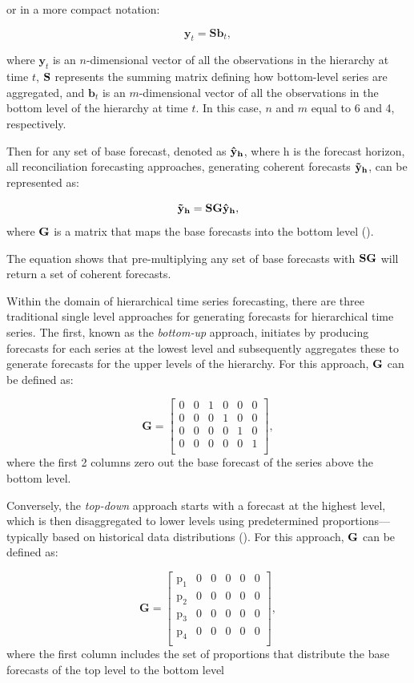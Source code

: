 \documentclass[
  11pt,
  a4paper,
]{article}
\begin{document}
or in a more compact notation:

\[
\textbf{y}_{t} = \textbf{S}\textbf{b}_{t},
\]

where \(\textbf{y}_t\) is an \(n\)-dimensional vector of all the
observations in the hierarchy at time \(t\), \(\bf{S}\) represents the
summing matrix defining how bottom-level series are aggregated, and
\(\textbf{b}_t\) is an \(m\)-dimensional vector of all the observations
in the bottom level of the hierarchy at time \(t\). In this case, \(n\)
and \(m\) equal to 6 and 4, respectively.

Then for any set of base forecast, denoted as \(\bf{\hat{y}}_{h}\),
where h is the forecast horizon, all reconciliation forecasting
approaches, generating coherent forecasts \(\bf{\tilde{y}}_{h}\), can be
represented as:

\[
\bf{\tilde{y}}_{h} = \bf{SG}\hat{\bf{y}}_{h},
\] where \(\bf{G}\) is a matrix that maps the base forecasts into the
bottom level (\textcite{hyndman2021forecasting}).

The equation shows that pre-multiplying any set of base forecasts with
\(\bf{SG}\) will return a set of coherent forecasts.

Within the domain of hierarchical time series forecasting, there are
three traditional single level approaches for generating forecasts for
hierarchical time series. The first, known as the \emph{bottom-up}
approach, initiates by producing forecasts for each series at the lowest
level and subsequently aggregates these to generate forecasts for the
upper levels of the hierarchy. For this approach, \(\bf{G}\) can be
defined as:

\[
\textbf{G}
=
\begin{bmatrix}
  0 & 0 & 1 & 0 & 0 & 0 \\
  0 & 0 & 0 & 1 & 0 & 0 \\
  0 & 0 & 0 & 0 & 1 & 0 \\
  0 & 0 & 0 & 0 & 0 & 1 \\
\end{bmatrix},
\] where the first 2 columns zero out the base forecast of the series
above the bottom level.

Conversely, the \emph{top-down} approach starts with a forecast at the
highest level, which is then disaggregated to lower levels using
predetermined proportions---typically based on historical data
distributions (\textcite{gross1990disaggregation}). For this approach,
\(\bf{G}\) can be defined as:

\[
\textbf{G}
=
\begin{bmatrix}
  \text{p}_{1} & 0 & 0 & 0 & 0 & 0 \\
  \text{p}_{2} & 0 & 0 & 0 & 0 & 0 \\
  \text{p}_{3} & 0 & 0 & 0 & 0 & 0 \\
  \text{p}_{4} & 0 & 0 & 0 & 0 & 0 \\
\end{bmatrix},
\] where the first column includes the set of proportions that
distribute the base forecasts of the top level to the bottom level
\end{document}
